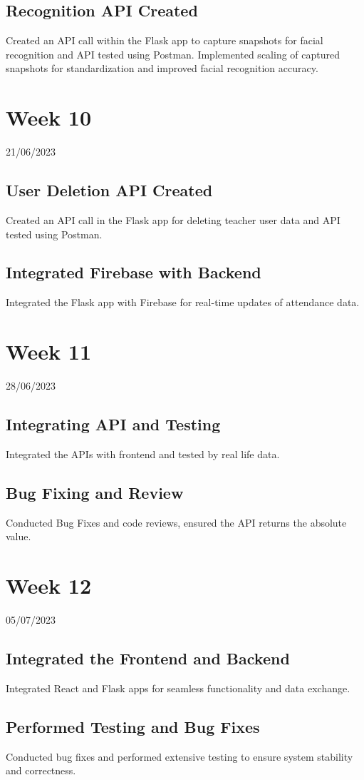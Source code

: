 \documentclass[12pt]{book}
\begin{document}
	\section{Recognition API Created}
	Created an API call within the Flask app to capture snapshots for facial recognition and API tested using Postman. Implemented scaling of captured snapshots for standardization and improved facial recognition accuracy.
	
	\chapter{Week 10}
	\justifying
	\large
	21/06/2023
	
	\paragraph{}
	\section{User Deletion API Created}
	Created an API call in the Flask app for deleting teacher user data and API tested using Postman.
	\section{Integrated Firebase with Backend}
	Integrated the Flask app with Firebase for real-time updates of attendance data.
	
	
	\chapter{Week 11}
	\justifying
	\large
	28/06/2023
	
	\paragraph{}
	\section{Integrating API and Testing}
	Integrated the APIs with frontend and tested by real life data.
	\section{Bug Fixing and Review}
	Conducted Bug Fixes and code reviews, ensured the API returns the absolute value.
	
	
	\chapter{Week 12}
	\justifying
	\large
	05/07/2023
	
	\paragraph{}
	\section{Integrated the Frontend and Backend}
	Integrated React and Flask apps for seamless functionality and data exchange.
	\section{Performed Testing and Bug Fixes}
	Conducted bug fixes and performed extensive testing to ensure system stability and correctness.
	
\end{document}
